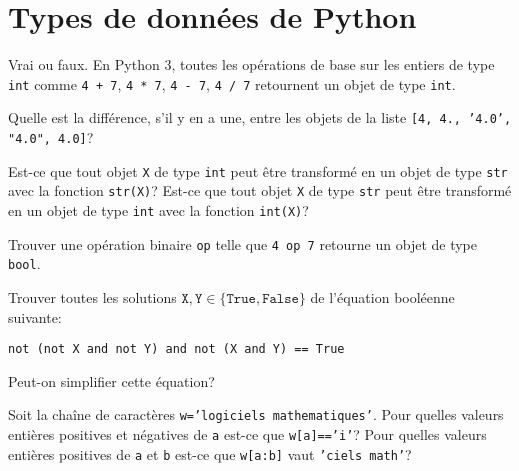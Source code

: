 
\section{Types de données de Python}

\begin{exercice}
    Vrai ou faux.
    En Python 3, toutes les opérations de base sur les entiers de type
    \texttt{int} comme 
    \texttt{4 + 7},
    \texttt{4 * 7},
    \texttt{4 - 7},
    \texttt{4 / 7}
    retournent un objet de type \texttt{int}.
\end{exercice}

\begin{exercice}
    Quelle est la différence, s'il y en a une, entre les objets de la liste
    \texttt{[4, 4., '4.0', "4.0", 4.0]}?
\end{exercice}

\begin{exercice}
    Est-ce que tout objet \texttt{X} de type \texttt{int} peut être
    transformé en un objet de type \texttt{str} avec la fonction
    \texttt{str(X)}?
    Est-ce que tout objet \texttt{X} de type \texttt{str} peut être
    transformé en un objet de type \texttt{int} avec la fonction
    \texttt{int(X)}?
\end{exercice}

\begin{exercice}
    Trouver une opération binaire \texttt{op} 
    telle que \texttt{4 op 7} retourne un objet de type \texttt{bool}.
\end{exercice}

\begin{exercice}
    Trouver toutes les solutions $\texttt{X},\texttt{Y}\in\{\texttt{True},
    \texttt{False}\}$ de l'équation booléenne suivante: 
    \begin{center}
	\texttt{not (not X and not Y) and not (X and Y) == True}
    \end{center}
    Peut-on simplifier cette équation?
\end{exercice}

\begin{exercice}
    Soit la chaîne de caractères \texttt{w='logiciels mathematiques'}. 
Pour quelles valeurs entières positives et négatives de \texttt{a} est-ce que
\texttt{w[a]=='i'}?
Pour quelles valeurs entières positives de \texttt{a} et \texttt{b} est-ce que
\texttt{w[a:b]} vaut \texttt{'ciels math'}?
\end{exercice}


